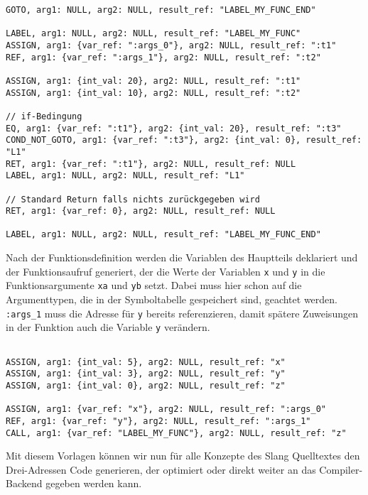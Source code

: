 \begin{lstlisting}[caption={Drei-Adressen Code Funktionsdeklaration}]
GOTO, arg1: NULL, arg2: NULL, result_ref: "LABEL_MY_FUNC_END"

LABEL, arg1: NULL, arg2: NULL, result_ref: "LABEL_MY_FUNC"
ASSIGN, arg1: {var_ref: ":args_0"}, arg2: NULL, result_ref: ":t1"
REF, arg1: {var_ref: ":args_1"}, arg2: NULL, result_ref: ":t2"

ASSIGN, arg1: {int_val: 20}, arg2: NULL, result_ref: ":t1"
ASSIGN, arg1: {int_val: 10}, arg2: NULL, result_ref: ":t2"

// if-Bedingung
EQ, arg1: {var_ref: ":t1"}, arg2: {int_val: 20}, result_ref: ":t3"
COND_NOT_GOTO, arg1: {var_ref: ":t3"}, arg2: {int_val: 0}, result_ref: "L1"
RET, arg1: {var_ref: ":t1"}, arg2: NULL, result_ref: NULL
LABEL, arg1: NULL, arg2: NULL, result_ref: "L1"

// Standard Return falls nichts zurückgegeben wird
RET, arg1: {var_ref: 0}, arg2: NULL, result_ref: NULL

LABEL, arg1: NULL, arg2: NULL, result_ref: "LABEL_MY_FUNC_END"
\end{lstlisting}

Nach der Funktionsdefinition werden die Variablen des Hauptteils deklariert und der Funktionsaufruf generiert, der die Werte der Variablen \texttt{x} und \texttt{y} in die Funktionsargumente \texttt{xa} und \texttt{yb} setzt.
Dabei muss hier schon auf die Argumenttypen, die in der Symboltabelle gespeichert sind, geachtet werden.
\texttt{:args\_1} muss die Adresse für \texttt{y} bereits referenzieren, damit spätere Zuweisungen in der Funktion auch die Variable \texttt{y} verändern.\\

\begin{lstlisting}[caption={Drei-Adressen Code Funktionsaufruf}]

ASSIGN, arg1: {int_val: 5}, arg2: NULL, result_ref: "x"
ASSIGN, arg1: {int_val: 3}, arg2: NULL, result_ref: "y"
ASSIGN, arg1: {int_val: 0}, arg2: NULL, result_ref: "z"

ASSIGN, arg1: {var_ref: "x"}, arg2: NULL, result_ref: ":args_0"
REF, arg1: {var_ref: "y"}, arg2: NULL, result_ref: ":args_1"
CALL, arg1: {var_ref: "LABEL_MY_FUNC"}, arg2: NULL, result_ref: "z"

\end{lstlisting}

Mit diesem Vorlagen können wir nun für alle Konzepte des Slang Quelltextes den Drei-Adressen Code generieren, der optimiert oder direkt weiter an das Compiler-Backend gegeben werden kann.

